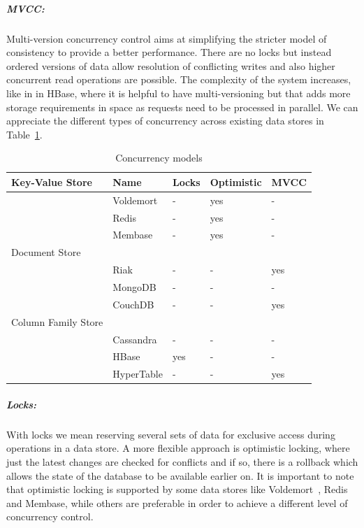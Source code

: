 		\subparagraph{MVCC:}
		Multi-version concurrency control aims at simplifying the stricter model of consistency to provide a better performance. There are no locks but instead ordered versions of data allow resolution of conflicting writes and also higher concurrent read operations are possible. The complexity of the system increases, like in in HBase, where it is helpful to have multi-versioning but that adds more storage requirements in space as requests need to be processed in parallel. We can appreciate the different types of concurrency across existing data stores in Table~\ref{table:concurrency}.
		
		\begin{table}[h]
		\begin{center}
    			\begin{tabular}{ | p{5cm} | l | l | l | l |}
   			\hline
			Key-Value Store & Name & Locks & Optimistic & MVCC \\ \hline   		
			 & Voldemort & - & yes & - \\ \hline
			 & Redis & - & yes & - \\ \hline
			 & Membase & 	- & yes & - \\ \hline
			
			Document Store &  &  &  &  \\ \hline
			 & Riak & - & - & yes \\ \hline			
			 & MongoDB & - & - & - \\ \hline
			 & CouchDB & - & - & yes \\ \hline
			Column Family Store &  &  &  &  \\ \hline
			 & Cassandra & - & - & - \\ \hline
			 & HBase & yes & - & - \\ \hline
			 & HyperTable & - & - & yes \\ \hline
    			\end{tabular}
		\end{center}
		\caption{Concurrency models}
		\label{table:concurrency}
		\end{table}		
	
		\subparagraph{Locks:}
		With locks we mean reserving several sets of data for exclusive access during operations in a data store. A more flexible approach is optimistic locking, where just the latest changes are checked for conflicts and if so, there is a rollback which allows the state of the database to be available earlier on. It is important to note that optimistic locking is supported by some data stores like Voldemort~\cite{Sumbaly:2012}, Redis and Membase, while others are preferable in order to achieve a different level of concurrency control.
		
